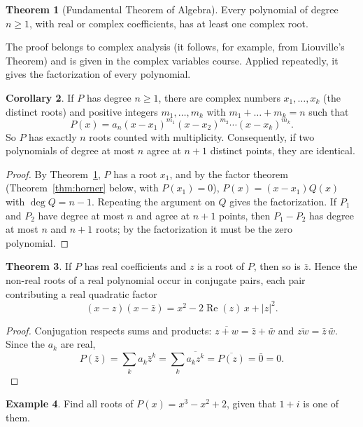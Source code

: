 \documentclass[11pt,a4paper]{article}
\numberwithin{equation}{section}
\theoremstyle{definition}
\newtheorem{thm}{Theorem}[subsection]
\newtheorem{exa}[thm]{Example}
\newtheorem{coro}[thm]{Corollary}
\begin{document}
\begin{thm}[Fundamental Theorem of Algebra]
\label{thm:fta}
Every polynomial of degree $n\geq1$, with real or complex coefficients, has at least one complex root.
\end{thm}

The proof belongs to complex analysis (it follows, for example, from Liouville's Theorem) and is given in the complex variables course.
Applied repeatedly, it gives the factorization of every polynomial.

\begin{coro}
\label{coro:factor}
If $P$ has degree $n\geq1$, there are complex numbers $x_1,\dots,x_k$ (the distinct roots) and positive integers $m_1,\dots,m_k$ with
$m_1+\dots+m_k = n$ such that
$$P(x) = a_n(x-x_1)^{m_1}(x-x_2)^{m_2}\cdots(x-x_k)^{m_k} .$$
So $P$ has exactly $n$ roots counted with multiplicity. Consequently, if two polynomials of degree at most $n$ agree at $n+1$ distinct
points, they are identical.
\end{coro}

\begin{proof}
By Theorem~\ref{thm:fta}, $P$ has a root $x_1$, and by the factor theorem (Theorem~\ref{thm:horner} below, with $P(x_1) = 0$),
$P(x) = (x-x_1)Q(x)$ with $\deg Q = n-1$. Repeating the argument on $Q$ gives the factorization. If $P_1$ and $P_2$ have degree at most $n$
and agree at $n+1$ points, then $P_1-P_2$ has degree at most $n$ and $n+1$ roots; by the factorization it must be the zero polynomial.
\end{proof}

\begin{thm}
\label{thm:conjroots}
If $P$ has real coefficients and $z$ is a root of $P$, then so is $\bar z$. Hence the non-real roots of a real polynomial occur in
conjugate pairs, each pair contributing a real quadratic factor
$$(x-z)(x-\bar z) = x^2-2\operatorname{Re}(z)\,x+|z|^2 .$$
\end{thm}

\begin{proof}
Conjugation respects sums and products: $\overline{z+w} = \bar z+\bar w$ and $\overline{zw} = \bar z\,\bar w$. Since the $a_k$ are real,
$$P(\bar z) = \sum_ka_k\bar z^k = \sum_k\overline{a_kz^k} = \overline{P(z)} = \bar0 = 0 .$$
\end{proof}

\begin{exa}
Find all roots of $P(x) = x^3-x^2+2$, given that $1+i$ is one of them.
\end{exa}
\end{document}
